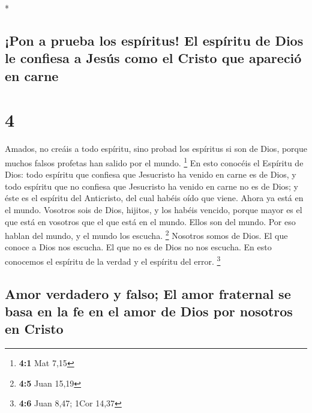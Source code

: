 \begin{paracol}{2}
\begin{otherlanguage}{english}
\end{otherlanguage}

\switchcolumn[0]*

\hypertarget{pon-a-prueba-los-espuxedritus-el-espuxedritu-de-dios-le-confiesa-a-jesuxfas-como-el-cristo-que-apareciuxf3-en-carne}{%
\subsection{¡Pon a prueba los espíritus! El espíritu de Dios le confiesa
a Jesús como el Cristo que apareció en
carne}\label{pon-a-prueba-los-espuxedritus-el-espuxedritu-de-dios-le-confiesa-a-jesuxfas-como-el-cristo-que-apareciuxf3-en-carne}}

\hypertarget{section-6}{%
\section{4}\label{section-6}}

 Amados, no creáis a todo espíritu, sino probad los
espíritus si son de Dios, porque muchos falsos profetas han salido por
el mundo. \footnote{\textbf{4:1} Mat 7,15}  En esto
conocéis el Espíritu de Dios: todo espíritu que confiesa que Jesucristo
ha venido en carne es de Dios,  y todo espíritu que no
confiesa que Jesucristo ha venido en carne no es de Dios; y éste es el
espíritu del Anticristo, del cual habéis oído que viene. Ahora ya está
en el mundo.  Vosotros sois de Dios, hijitos, y los habéis
vencido, porque mayor es el que está en vosotros que el que está en el
mundo.  Ellos son del mundo. Por eso hablan del mundo, y
el mundo los escucha. \footnote{\textbf{4:5} Juan 15,19} 
Nosotros somos de Dios. El que conoce a Dios nos escucha. El que no es
de Dios no nos escucha. En esto conocemos el espíritu de la verdad y el
espíritu del error. \footnote{\textbf{4:6} Juan 8,47; 1Cor 14,37}

\hypertarget{amor-verdadero-y-falso-el-amor-fraternal-se-basa-en-la-fe-en-el-amor-de-dios-por-nosotros-en-cristo}{%
\subsection{Amor verdadero y falso; El amor fraternal se basa en la fe
en el amor de Dios por nosotros en
Cristo}\label{amor-verdadero-y-falso-el-amor-fraternal-se-basa-en-la-fe-en-el-amor-de-dios-por-nosotros-en-cristo}}


\end{paracol}
